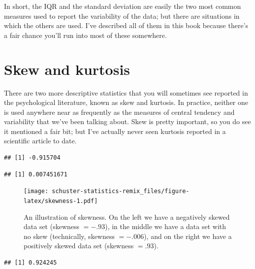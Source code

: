 \documentclass[
]{book}
\begin{document}
In short, the IQR and the standard deviation are easily the two most common measures used to report the variability of the data; but there are situations in which the others are used. I've described all of them in this book because there's a fair chance you'll run into most of these somewhere.

\hypertarget{skewandkurtosis}{%
\section{Skew and kurtosis}\label{skewandkurtosis}}

There are two more descriptive statistics that you will sometimes see reported in the psychological literature, known as skew and kurtosis. In practice, neither one is used anywhere near as frequently as the measures of central tendency and variability that we've been talking about. Skew is pretty important, so you do see it mentioned a fair bit; but I've actually never seen kurtosis reported in a scientific article to date.

\begin{verbatim}
## [1] -0.915704
\end{verbatim}

\begin{verbatim}
## [1] 0.007451671
\end{verbatim}

\begin{figure}
\centering
\texttt{[image: schuster-statistics-remix\_files/figure-latex/skewness-1.pdf]}
\caption{\label{fig:skewness}An illustration of skewness. On the left we have a negatively skewed data set (skewness \(= -.93\)), in the middle we have a data set with no skew (technically, skewness \(= -.006\)), and on the right we have a positively skewed data set (skewness \(= .93\)).}
\end{figure}

\begin{verbatim}
## [1] 0.924245
\end{verbatim}
\end{document}
